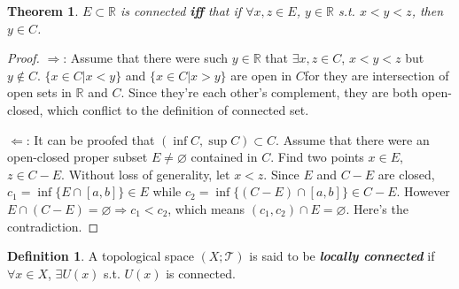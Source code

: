 \documentclass[openany]{book}
\newcommand*{\indexbf}[1]{\emph{\textbf{#1}}\index{#1}} %
\theoremstyle{plain}
\newtheorem{theorem}{Theorem}[section] %
\theoremstyle{definition}
\newtheorem{definition}{Definition}[section] %
\newcommand{\emphbf}[1]{\emph{\textbf{#1}}}
\begin{document}
\begin{theorem}\label{R_connected}
$E\subset\mathbb{R}$ is connected \emphbf{iff} that if $\forall x,z\in E$, $y\in\mathbb{R}$ s.t. $x<y<z$, then $y\in C$.
\end{theorem}
\begin{proof}
	$\Rightarrow$: Assume that there were such $y\in\mathbb{R}$ that $\exists x,z\in C$, $x<y<z$ but $y\notin C$. $\{x\in C|x<y\}$ and $\{x\in C|x>y\}$ are open in $C$for they are intersection of open sets in $\mathbb{R}$ and $C$. Since they're each other's complement, they are both open-closed, which conflict to the definition of connected set.
	
	$\Leftarrow$: It can be proofed that $(\inf C,\sup C)\subset C$. Assume that there were an open-closed proper subset $E\neq\varnothing$ contained in $C$. Find two points $x\in E$, $z\in C - E$. Without loss of generality, let $x<z$. Since $E$ and $C-E$ are closed, $c_1=\inf \{E\cap \left[a,b\right]\}\in E$ while $c_2=\inf \{(C-E)\cap [a,b]\}\in C-E$. However $E\cap(C-E)=\varnothing\Rightarrow c_1<c_2$, which means $(c_1,c_2)\cap E=\varnothing$. Here's the contradiction.
\end{proof}
\begin{definition}\label{locally_connected}
A topological space $( X; \mathscr{T})$ is said to be \indexbf{locally connected} if $\forall x \in X$, $\exists U( x) $ s.t. $U( x)$ is connected.
\end{definition}
\end{document}
